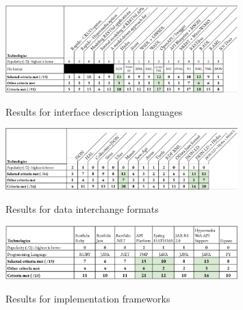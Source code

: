 \begin{figure}[ht]
\caption{Results for interface description languages}
\centering
\includegraphics[width=0.8\textwidth]{figures/example-idl-results.png}
\label{example-idl-results}
\vspace*{-0.5cm}
\end{figure}

\vspace*{-0.7cm}


\begin{figure}[ht]
\caption{Results for data interchange formats}
\centering
\includegraphics[width=0.8\textwidth]{figures/example-dif-results.png}
\label{example-dif-results}
\vspace*{-0.5cm}
\end{figure}

\vspace*{-0.7cm}


\begin{figure}[ht]
\caption{Results for implementation frameworks}
\centering
\includegraphics[width=0.8\textwidth]{figures/example-frameworks-results.png}
\label{example-frameworks-results}
\vspace*{-0.3cm}
\end{figure}

\vspace*{-0.3cm}


